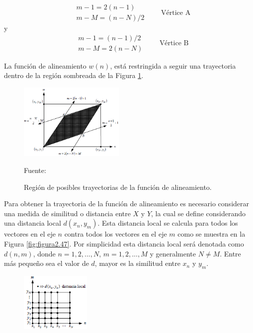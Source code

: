 \begin{enumerate}
\begin{equation}
\label{eq:ecuacion74}
\begin{aligned}
& m - 1 = 2(n - 1) \\
& m - M = (n - N)/2
\end{aligned}
\qquad
\text{Vértice A}
\end{equation}
y
\begin{equation}
\label{eq:ecuacion75}
\begin{aligned}
& m - 1 = (n - 1)/2 \\
& m - M = 2(n - N)
\end{aligned}
\qquad
\text{Vértice B}
\end{equation}

La función de alineamiento $w(n)$, está restringida a seguir una trayectoria dentro de la región sombreada de la Figura \ref{fig:figura2.46}.
\begin{figure}[H]
\begin{center}
\includegraphics[width=0.45\textwidth]{Imagenes/Cap2/image047}
\end{center}
\begin{center}
\vskip -0.5cm
\caption{\small{Región de posibles trayectorias de la función de alineamiento.}}
\label{fig:figura2.46}
{\small{Fuente: \cite{rabiner}}}
\end{center}
\end{figure}
Para obtener la trayectoria de la función de alineamiento es necesario considerar una medida de similitud o distancia entre $X$ y $Y$, la cual se define considerando una distancia local $d(x_{n},y_{m})$. Esta distancia local se calcula para todos los vectores en el eje $n$ contra todos los vectores en el eje $m$ como se muestra en la Figura \ref{fig:figura2.47}. Por simplicidad esta distancia local será denotada como $d(n, m)$, donde $n = 1,2,...,N$, $m = 1,2,...,M$ y generalmente $N \neq M$. Entre más pequeño sea el valor de $d$, mayor es la similitud entre $x_{n}$ y $y_{m}$.
\begin{figure}[H]
\begin{center}
\includegraphics[width=0.3\textwidth]{Imagenes/Cap2/image048}

\end{center}
\end{figure}
\end{enumerate}
